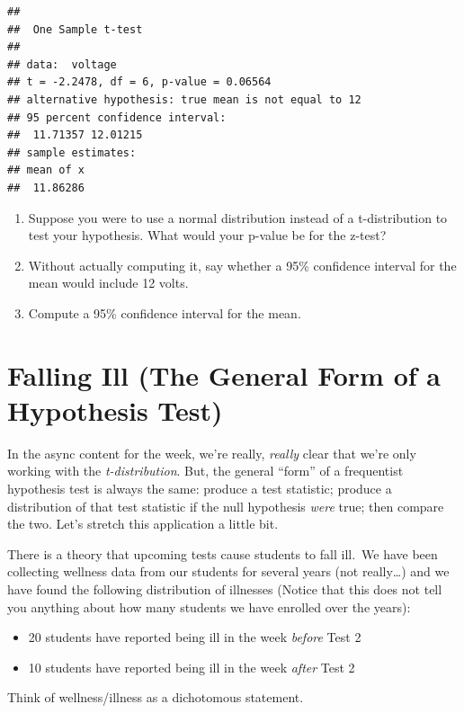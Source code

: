 \documentclass[
]{book}
\theoremstyle{definition}
\theoremstyle{definition}
\theoremstyle{definition}
\theoremstyle{definition}
\theoremstyle{remark}
\begin{document}
\begin{verbatim}
## 
##  One Sample t-test
## 
## data:  voltage
## t = -2.2478, df = 6, p-value = 0.06564
## alternative hypothesis: true mean is not equal to 12
## 95 percent confidence interval:
##  11.71357 12.01215
## sample estimates:
## mean of x 
##  11.86286
\end{verbatim}

\begin{enumerate}
\def\labelenumi{\arabic{enumi}.}
\setcounter{enumi}{5}
\item
  Suppose you were to use a normal distribution instead of a t-distribution to test your hypothesis. What would your p-value be for the z-test?
\item
  Without actually computing it, say whether a 95\% confidence interval for the mean would include 12 volts.
\item
  Compute a 95\% confidence interval for the mean.
\end{enumerate}

\section{Falling Ill (The General Form of a Hypothesis Test)}\label{falling-ill-the-general-form-of-a-hypothesis-test}

In the async content for the week, we're really, \emph{really} clear that we're only working with the \emph{t-distribution}. But, the general ``form'' of a frequentist hypothesis test is always the same: produce a test statistic; produce a distribution of that test statistic if the null hypothesis \emph{were} true; then compare the two. Let's stretch this application a little bit.

There is a theory that upcoming tests cause students to fall ill.~We have been collecting wellness data from our students for several years (not really\ldots) and we have found the following distribution of illnesses (Notice that this does not tell you anything about how many students we have enrolled over the years):

\begin{itemize}
\item
  20 students have reported being ill in the week \emph{before} Test 2
\item
  10 students have reported being ill in the week \emph{after} Test 2
\end{itemize}

Think of wellness/illness as a dichotomous statement.
\end{document}
